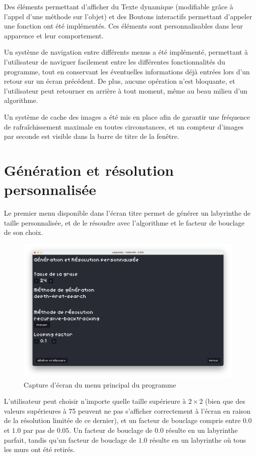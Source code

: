 \documentclass[12pt]{scrreprt} %
\begin{document}
Des éléments permettant d'afficher du Texte dynamique (modifiable grâce à l'appel d'une méthode sur l'objet) et des Boutons interactifs permettant d'appeler une fonction ont été implémentés. Ces éléments sont personnalisables dans leur apparence et leur comportement.

Un système de navigation entre différents menus a été implémenté, permettant à l'utilisateur de naviguer facilement entre les différentes fonctionnalités du programme, tout en conservant les éventuelles informations déjà entrées lors d'un retour sur un écran précédent. De plus, aucune opération n'est bloquante, et l'utilisateur peut retourner en arrière à tout moment, même au beau milieu d'un algorithme.

Un système de cache des images a été mis en place afin de garantir une fréquence de rafraîchissement maximale en toutes circonstances, et un compteur d'images par seconde est visible dans la barre de titre de la fenêtre.

\section{Génération et résolution personnalisée}

Le premier menu disponible dans l'écran titre permet de générer un labyrinthe de taille personnalisée, et de le résoudre avec l'algorithme et le facteur de bouclage de son choix.

\begin{figure}[h]
    \centering
    \includegraphics[width=\textwidth]{images/generationcustom.png}
    \caption{Capture d'écran du menu principal du programme}
\end{figure}

L'utilisateur peut choisir n'importe quelle taille supérieure à $2 \times 2$ (bien que des valeurs supérieures à 75 peuvent ne pas s'afficher correctement à l'écran en raison de la résolution limitée de ce dernier), et un facteur de bouclage compris entre $0.0$ et $1.0$ par pas de $0.05$. Un facteur de bouclage de $0.0$ résulte en un labyrinthe parfait, tandis qu'un facteur de bouclage de $1.0$ résulte en un labyrinthe où tous les murs ont été retirés.
\end{document}
